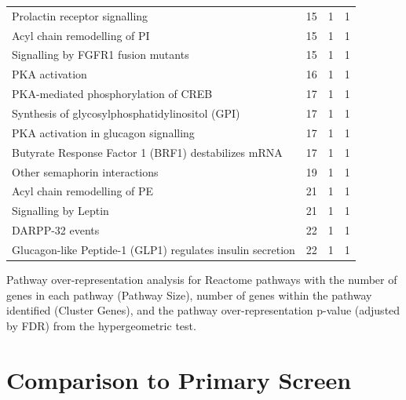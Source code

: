 \begin{table}[!hp]
{\begin{threeparttable}
\begin{tabular}{lccc}
  \rowcolor{Cluster_Red!15}
  Prolactin receptor signalling &  15 &   1 &   1 \\ 
  \rowcolor{Cluster_Red!20}
  Acyl chain remodelling of PI &  15 &   1 &   1 \\ 
  \rowcolor{Cluster_Red!15}
  Signalling by FGFR1 fusion mutants &  15 &   1 &   1 \\ 
  \rowcolor{Cluster_Red!20}
  PKA activation &  16 &   1 &   1 \\ 
  \rowcolor{Cluster_Red!15}
  PKA-mediated phosphorylation of CREB &  17 &   1 &   1 \\ 
  \rowcolor{Cluster_Red!20}
  Synthesis of glycosylphosphatidylinositol (GPI) &  17 &   1 &   1 \\ 
  \rowcolor{Cluster_Red!15}
  PKA activation in glucagon signalling &  17 &   1 &   1 \\ 
  \rowcolor{Cluster_Red!20}
  Butyrate Response Factor 1 (BRF1) destabilizes \acrshort{mRNA} &  17 &   1 &   1 \\ 
  \rowcolor{Cluster_Red!15}
  Other semaphorin interactions &  19 &   1 &   1 \\ 
  \rowcolor{Cluster_Red!20}
  Acyl chain remodelling of PE &  21 &   1 &   1 \\ 
  \rowcolor{Cluster_Red!15}
  Signalling by Leptin &  21 &   1 &   1 \\ 
  \rowcolor{Cluster_Red!20}
  DARPP-32 events &  22 &   1 &   1 \\ 
  \rowcolor{Cluster_Red!15}
  Glucagon-like Peptide-1 (GLP1) regulates insulin secretion &  22 &   1 &   1 \\ 
  \hline
\end{tabular}
\begin{tablenotes}
\raggedright %
Pathway over-representation analysis for Reactome pathways with the number of genes in each pathway (Pathway Size), number of genes within the pathway identified (Cluster Genes), and the pathway over-representation p-value (adjusted by \gls{FDR}) from the hypergeometric test.  
\end{tablenotes}
\end{threeparttable}
}
\end{table}

\FloatBarrier

\section{Comparison to Primary Screen} \label{appendix:compare_mtSL_genes_stad}

